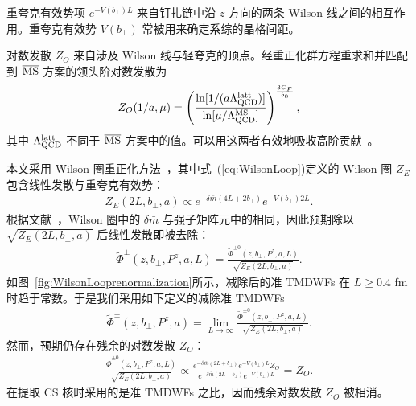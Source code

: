 重夸克有效势项 $e^{-V(b_{\perp})L}$ 来自钉扎链中沿 $z$ 方向的两条 Wilson 线之间的相互作用。重夸克有效势 $V(b_{\perp})$ 常被用来确定系综的晶格间距。

对数发散 $Z_{O}$ 来自涉及 Wilson 线与轻夸克的顶点。经重正化群方程重求和并匹配到 $\overline{\rm MS}$ 方案的领头阶对数发散为~\cite{Ji:1991pr, LatticePartonCollaborationLPC:2021xdx}
\begin{align}\label{eq:ZO_RS_higher}
Z_{O}(1/a, \mu)=\left(\frac{\ln [1 /(a \Lambda_{\rm QCD}^{\rm latt})]}{\ln [\mu / \Lambda_{\rm QCD}^{\rm MS}]}\right)^{\frac{3 C_{F}}{b_0}},\nonumber\\
\end{align}
其中 $\Lambda_{\rm QCD}^{\rm latt}$ 不同于 $\overline{\rm MS}$ 方案中的值。可以用这两者有效地吸收高阶贡献~\cite{Lepage:1992xa}。

本文采用 Wilson 圈重正化方法~\cite{Chen:2016fxx,Zhang:2017bzy,Musch:2010ka,Green:2017xeu,Zhang:2017zfe}，其中式~(\ref{eq:WilsonLoop})定义的 Wilson 圈 $Z_E$ 包含线性发散与重夸克有效势：
\begin{align}
Z_E\left(2L, b_{\perp}, a\right) \propto e^{-\delta \bar{m}(4L+2b_{\perp})}e^{-V(b_{\perp})2L}.
\end{align}
根据文献~\cite{LatticePartonCollaborationLPC:2021xdx}，Wilson 圈中的 $\delta \bar{m}$ 与强子矩阵元中的相同，因此预期除以 $\sqrt{Z_E\left(2L, b_{\perp}, a\right)}$ 后线性发散即被去除：
\begin{align}
\tilde{\Phi}^{\pm}(z,b_{\perp},P^z,a,L)=\frac{\tilde{\Phi}^{\pm0}\left(z,b_{\perp},P^z,a,L\right)}{\sqrt{Z_E\left(2L, b_{\perp}, a\right)}}.
\end{align}
如图~\ref{fig:WilsonLooprenormalization}所示，减除后的准 TMDWFs 在 $L\ge 0.4$ fm 时趋于常数。于是我们采用如下定义的减除准 TMDWFs
\begin{align}\label{eq:WLRQuasi}
\tilde{\Phi}^{\pm}(z,b_{\perp},P^z, a)=\lim_{L\to\infty}\frac{\tilde{\Phi}^{\pm0}\left(z,b_{\perp},P^z,a,L\right)}{\sqrt{Z_E\left(2L, b_{\perp}, a\right)}}.
\end{align}
然而，预期仍存在残余的对数发散 $Z_{O}$：
\begin{align}
\frac{\tilde{\Phi}^{\pm0}\left(z,b_{\perp},P^z,a,L\right)}{\sqrt{Z_E\left(2L, b_{\perp}, a\right)}}
\propto \frac{e^{-\delta \bar{m}(2L+b_{\perp})}e^{-V(b_{\perp})L}Z_{O}}{e^{-\delta \bar{m}(2L+b_{\perp})}e^{-V(b_{\perp})L}}
= Z_{O}.
\end{align}
在提取 CS 核时采用的是准 TMDWFs 之比，因而残余对数发散 $Z_{O}$ 被相消。



